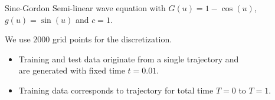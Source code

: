 \begin{frame}[c]{Sine-Gordon}
  Semi-linear wave equation with $G(u) = 1 - \cos(u)$, $g(u) = \sin(u)$ and $c=1$.

  We use $2000$ grid points for the discretization.

  \vspace{0.3cm}
  \begin{itemize}
    \item Training and test data originate from a single trajectory and\\
    are generated with fixed time $t = 0.01$.
    \item Training data corresponds to trajectory for total time $T=0$ to $T=1$.
  \end{itemize}
\end{frame}

